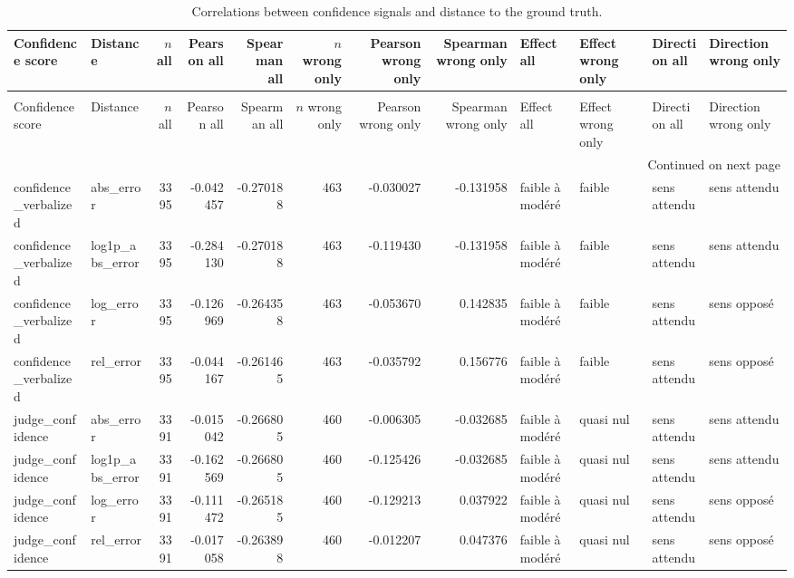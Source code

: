 \begin{longtable}{llrrrrrrllll}
\caption{Correlations between confidence signals and distance to the ground truth.} \label{tab:confidence_distance_correlations} \\
\toprule
Confidence score & Distance & $n$ all & Pearson all & Spearman all & $n$ wrong only & Pearson wrong only & Spearman wrong only & Effect all & Effect wrong only & Direction all & Direction wrong only \\
\midrule
\endfirsthead
\caption[]{Correlations between confidence signals and distance to the ground truth.} \\
\toprule
Confidence score & Distance & $n$ all & Pearson all & Spearman all & $n$ wrong only & Pearson wrong only & Spearman wrong only & Effect all & Effect wrong only & Direction all & Direction wrong only \\
\midrule
\endhead
\midrule
\multicolumn{12}{r}{Continued on next page} \\
\midrule
\endfoot
\bottomrule
\endlastfoot
confidence_verbalized & abs_error & 3395 & -0.042457 & -0.270188 & 463 & -0.030027 & -0.131958 & faible à modéré & faible & sens attendu & sens attendu \\
confidence_verbalized & log1p_abs_error & 3395 & -0.284130 & -0.270188 & 463 & -0.119430 & -0.131958 & faible à modéré & faible & sens attendu & sens attendu \\
confidence_verbalized & log_error & 3395 & -0.126969 & -0.264358 & 463 & -0.053670 & 0.142835 & faible à modéré & faible & sens attendu & sens opposé \\
confidence_verbalized & rel_error & 3395 & -0.044167 & -0.261465 & 463 & -0.035792 & 0.156776 & faible à modéré & faible & sens attendu & sens opposé \\
judge_confidence & abs_error & 3391 & -0.015042 & -0.266805 & 460 & -0.006305 & -0.032685 & faible à modéré & quasi nul & sens attendu & sens attendu \\
judge_confidence & log1p_abs_error & 3391 & -0.162569 & -0.266805 & 460 & -0.125426 & -0.032685 & faible à modéré & quasi nul & sens attendu & sens attendu \\
judge_confidence & log_error & 3391 & -0.111472 & -0.265185 & 460 & -0.129213 & 0.037922 & faible à modéré & quasi nul & sens attendu & sens opposé \\
judge_confidence & rel_error & 3391 & -0.017058 & -0.263898 & 460 & -0.012207 & 0.047376 & faible à modéré & quasi nul & sens attendu & sens opposé \\

\end{longtable}
